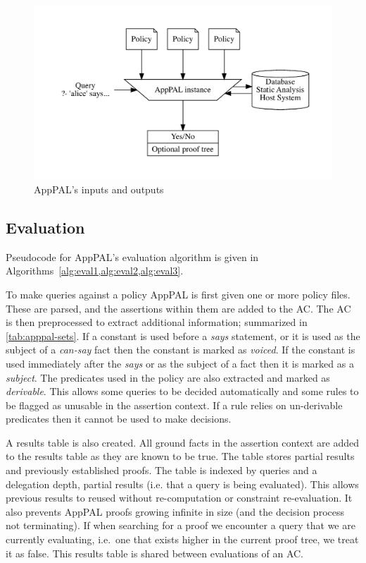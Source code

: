 \documentclass[thesis.tex]{subfiles}
\begin{document}
\begin{figure}
  \centering
  \includegraphics[width=\linewidth]{figures/apppal-evaluation.pdf}
  \caption{AppPAL's inputs and outputs}
  \label{fig:apppal-inputs-outputs}
\end{figure}

\subsection{Evaluation}
\label{ssec:evaluation-alg}

Pseudocode for AppPAL's evaluation algorithm is given in Algorithms~\cref{alg:eval1,alg:eval2,alg:eval3}.

To make queries against a policy AppPAL is first given one or more policy files.
These are parsed, and the assertions within them are added to the \ac{AC}.
The AC is then preprocessed to extract additional information; summarized in \autoref{tab:apppal-sets}.
If a constant is used before a \emph{says} statement, or it is used as the subject of a \emph{can-say} fact then the constant is marked as \emph{voiced}.
If the constant is used immediately after the \emph{says} or as the subject of a fact then it is marked as a \emph{subject}.
The predicates used in the policy are also extracted and marked as \emph{derivable}.
This allows some queries to be decided automatically and some rules to be flagged as unusable in the assertion context.
If a rule relies on un-derivable predicates then it cannot be used to make decisions.

A results table is also created.
All ground facts in the assertion context are added to the results table as they are known to be true.
The table stores partial results and previously established proofs.
The table is indexed by queries and a delegation depth, partial results (i.e. that a query is being evaluated).
This allows previous results to reused without re-computation or constraint re-evaluation.
It also prevents AppPAL proofs growing infinite in size (and the decision process not terminating).
If when searching for a proof we encounter a query that we are currently evaluating, i.e.~one that exists higher in the current proof tree, we treat it as false. 
This results table is shared between evaluations of an \ac{AC}.
\end{document}
